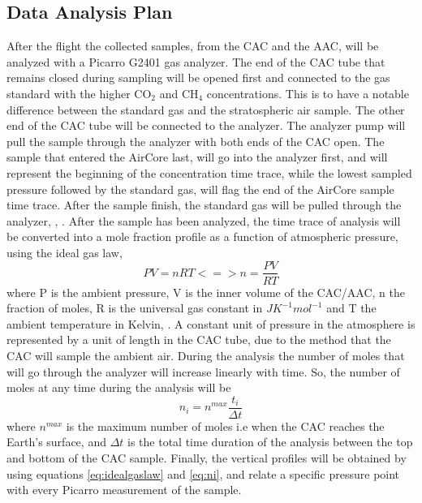 \subsection{Data Analysis Plan}

After the flight the collected samples, from the CAC and the AAC, will be analyzed with a Picarro G2401 gas analyzer. The end of the CAC tube that remains closed during sampling will be opened first and connected to the gas standard with the higher CO$_2$ and CH$_4$ concentrations. This is to have a notable difference between the standard gas and the stratospheric air sample. The other end of the CAC tube will be connected to the analyzer. The analyzer pump will pull the sample through the analyzer with both ends of the CAC open. The sample that entered the AirCore last, will go into the analyzer first, and will represent the beginning of the concentration time trace, while the lowest sampled pressure followed by the standard gas, will flag the end of the AirCore sample time trace. After the sample finish, the standard gas will be pulled through the analyzer, \cite{Karion}, \cite{Olivier}.
After the sample has been analyzed, the time trace of analysis will be converted into a mole fraction profile as a function of atmospheric pressure, using the ideal gas law,
\begin{equation}
    PV = nRT <=> n = \frac{PV}{RT}
    \label{eq:idealgaslaw}
\end{equation}
where P is the ambient pressure, V is the inner volume of the CAC/AAC, n the fraction of moles, R is the universal gas constant in $J K^{-1} mol^{-1}$ and T the ambient temperature in Kelvin, \cite{Olivier}. 
A constant unit of pressure in the atmosphere is represented by a unit of length in the CAC tube, due to the method that the CAC will sample the ambient air.
During the analysis the number of moles that will go through the analyzer will increase linearly with time. So, the number of moles at any time during the analysis will be
\begin{equation}
    n_i = n^{max}\frac{t_i}{\Delta t}
    \label{eq:ni}
\end{equation}
where $n^{max}$ is the maximum number of moles i.e when the CAC reaches the Earth's surface, and $\Delta t$ is the total time duration of the analysis between the top and bottom of the CAC sample.   
Finally, the vertical profiles will be obtained by using equations \ref{eq:idealgaslaw} and \ref{eq:ni}, and relate a specific pressure point with every Picarro measurement of the sample.   

